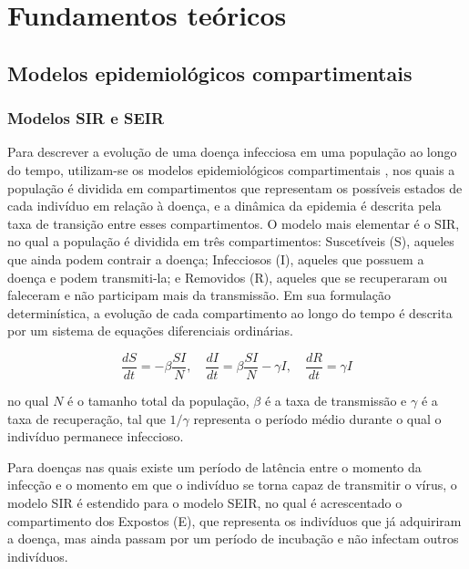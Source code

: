 \chapter{Fundamentos teóricos}
\label{FT}

\section{Modelos epidemiológicos compartimentais}

\subsection{Modelos SIR e SEIR}

Para descrever a evolução de uma doença infecciosa em uma população ao longo do tempo, utilizam-se os modelos epidemiológicos compartimentais \cite{keeling2008}, nos quais a população é dividida em compartimentos que representam os possíveis estados de cada indivíduo em relação à doença, e a dinâmica da epidemia é descrita pela taxa de transição entre esses compartimentos. O modelo mais elementar é o SIR, no qual a população é dividida em três compartimentos: Suscetíveis (S), aqueles que ainda podem contrair a doença; Infecciosos (I), aqueles que possuem a doença e podem transmiti-la; e Removidos (R), aqueles que se recuperaram ou faleceram e não participam mais da transmissão. Em sua formulação determinística, a evolução de cada compartimento ao longo do tempo é descrita por um sistema de equações diferenciais ordinárias.

\begin{equation}\label{eqn:sir}
    \frac{dS}{dt} = -\beta \frac{S I}{N}, \quad
    \frac{dI}{dt} = \beta \frac{S I}{N} - \gamma I, \quad
    \frac{dR}{dt} = \gamma I
\end{equation}

no qual $N$ é o tamanho total da população, $\beta$ é a taxa de transmissão e $\gamma$ é a taxa de recuperação, tal que $1/\gamma$ representa o período médio durante o qual o indivíduo permanece infeccioso.

Para doenças nas quais existe um período de latência entre o momento da infecção e o momento em que o indivíduo se torna capaz de transmitir o vírus, o modelo SIR é estendido para o modelo SEIR, no qual é acrescentado o compartimento dos Expostos (E), que representa os indivíduos que já adquiriram a doença, mas ainda passam por um período de incubação e não infectam outros indivíduos.

